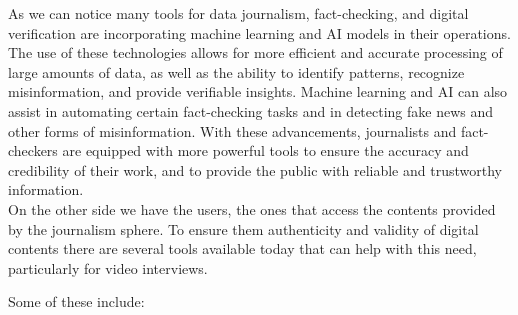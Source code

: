 \documentclass[target=mst,aauheader=]{thud}
\begin{document}
As we can notice many tools for data journalism, fact-checking, and digital verification are incorporating machine learning and AI models in their operations. The use of these technologies allows for more efficient and accurate processing of large amounts of data, as well as the ability to identify patterns, recognize misinformation, and provide verifiable insights. Machine learning and AI can also assist in automating certain fact-checking tasks and in detecting fake news and other forms of misinformation. With these advancements, journalists and fact-checkers are equipped with more powerful tools to ensure the accuracy and credibility of their work, and to provide the public with reliable and trustworthy information.\\

On the other side we have the users, the ones that access the contents provided by the journalism sphere. To ensure them authenticity and validity of digital contents there are several tools available today that can help with this need, particularly for video interviews.\par
Some of these include:
\end{document}
